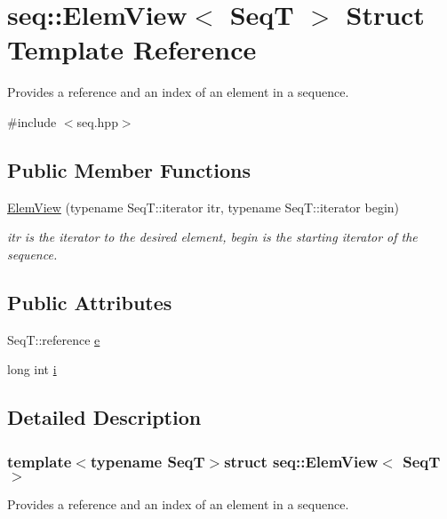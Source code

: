 \hypertarget{structseq_1_1_elem_view}{\section{seq\-:\-:Elem\-View$<$ Seq\-T $>$ Struct Template Reference}
\label{structseq_1_1_elem_view}
}


Provides a reference and an index of an element in a sequence.  




{\ttfamily \#include $<$seq.\-hpp$>$}

\subsection*{Public Member Functions}
\begin{DoxyCompactItemize}
\item 
\hyperlink{structseq_1_1_elem_view_ad435d6c641e7b7e6123d472d4e41fa68}{Elem\-View} (typename Seq\-T\-::iterator itr, typename Seq\-T\-::iterator begin)
\begin{DoxyCompactList}\small\item\em {\ttfamily itr} is the iterator to the desired element, {\ttfamily begin} is the starting iterator of the sequence. \end{DoxyCompactList}\end{DoxyCompactItemize}
\subsection*{Public Attributes}
\begin{DoxyCompactItemize}
\item 
Seq\-T\-::reference \hyperlink{structseq_1_1_elem_view_aebd98f7c33ce0c247fe5257178eedb12}{e}
\item 
long int \hyperlink{structseq_1_1_elem_view_ac33a32152d16f22e2378e1fed6a88442}{i}
\end{DoxyCompactItemize}


\subsection{Detailed Description}
\subsubsection*{template$<$typename Seq\-T$>$struct seq\-::\-Elem\-View$<$ Seq\-T $>$}

Provides a reference and an index of an element in a sequence. 



